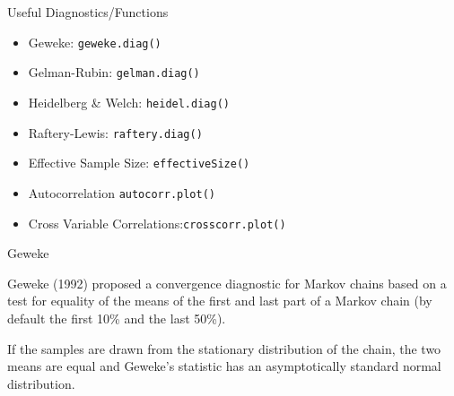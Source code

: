\documentclass[dvips]{beamer}
\begin{document}
\begin{slide}{Useful Diagnostics/Functions}
  \begin{itemize}
  \item Geweke:  {\tt geweke.diag()}
  \item Gelman-Rubin: {\tt gelman.diag()}
  \item Heidelberg \& Welch: {\tt heidel.diag()}
  \item Raftery-Lewis: {\tt raftery.diag()}
  \item Effective Sample Size: {\tt effectiveSize()}
  \item Autocorrelation {\tt autocorr.plot()}
  \item Cross Variable Correlations:{\tt  crosscorr.plot()}
  \end{itemize}
\end{slide}
\begin{slide}{Geweke}

Geweke (1992) proposed a convergence diagnostic for Markov chains based on a test for equality
of the means of the first and last part of a Markov chain (by default the first 10\% and the last 50\%).

\vspace{.25in}
If the samples are drawn from the stationary distribution of the chain, the two means are equal and
Geweke's statistic has an asymptotically standard normal distribution.
  
\end{slide}
\end{document}
